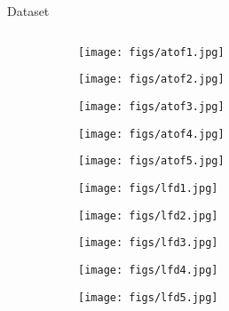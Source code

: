 \begin{frame}{Dataset}{}
\begin{block}{}
\begin{columns}
\begin{column}{1\textwidth}
                \begin{figure}[H]
                    \begin{subfigure}[b]{0.1\textwidth}
                        \texttt{[image: figs/atof1.jpg]}
                    \end{subfigure}
                    \quad
                    \begin{subfigure}[b]{0.1\textwidth}
                        \texttt{[image: figs/atof2.jpg]}
                    \end{subfigure}
                    \quad
                    \begin{subfigure}[b]{0.1\textwidth}
                        \texttt{[image: figs/atof3.jpg]}
                    \end{subfigure}
                    \quad
                    \begin{subfigure}[b]{0.1\textwidth}
                        \texttt{[image: figs/atof4.jpg]}
                    \end{subfigure}
                    \quad
                    \begin{subfigure}[b]{0.1\textwidth}
                        \texttt{[image: figs/atof5.jpg]}
                    \end{subfigure}
                \end{figure}

                \begin{figure}[H]
                    \begin{subfigure}[b]{0.1\textwidth}
                        \texttt{[image: figs/lfd1.jpg]}
                    \end{subfigure}
                    \quad
                    \begin{subfigure}[b]{0.1\textwidth}
                        \texttt{[image: figs/lfd2.jpg]}
                    \end{subfigure}
                    \quad
                    \begin{subfigure}[b]{0.1\textwidth}
                        \texttt{[image: figs/lfd3.jpg]}
                    \end{subfigure}
                    \quad
                    \begin{subfigure}[b]{0.1\textwidth}
                        \texttt{[image: figs/lfd4.jpg]}
                    \end{subfigure}
                    \quad
                    \begin{subfigure}[b]{0.1\textwidth}
                        \texttt{[image: figs/lfd5.jpg]}
                    \end{subfigure}
                \end{figure}



\end{column}
\end{columns}
\end{block}
\end{frame}
